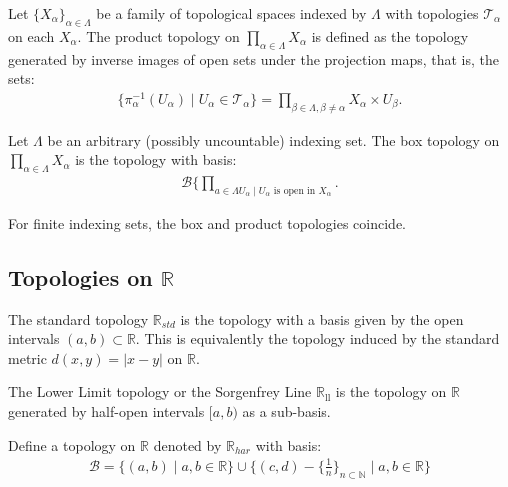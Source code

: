 \documentclass[12pt,letterpaper,reqno]{article}
\begin{document}
\begin{topology}\label{topology:product-topology}
    Let $\{ X_{\alpha} \}_{\alpha \in \Lambda}$ be a family of topological spaces indexed by $\Lambda$ with topologies $\mathcal{T}_{\alpha}$ on each $X_{\alpha}$. The product topology on $\prod_{\alpha \in \Lambda} X_{\alpha}$ is defined as the topology generated by inverse images of open sets under the projection maps, that is, the sets:
    \begin{align*}
        \{ \pi_{\alpha}^{-1}(U_\alpha) \mid U_{\alpha} \in \mathcal{T}_{\alpha} \} = \prod_{\beta \in \Lambda, \beta \neq \alpha } X_{\alpha} \times U_{\beta}.
    \end{align*}
\end{topology}

\begin{topology}\label{topology:box-topology}
    Let $\Lambda$ be an arbitrary (possibly uncountable) indexing set. The box topology on $\prod_{\alpha \in \Lambda} X_{\alpha}$ is the topology with basis:
    \begin{align*}
        \mathcal{B} \{ \prod_{a \in \Lambda U_{\alpha} \mid U_{\alpha} \text{ is open in } X_{\alpha}}.
    \end{align*}
\end{topology}

For finite indexing sets, the box and product topologies coincide.

\subsection{Topologies on $\mathbb{R}$}

\begin{topology}\label{topology:r-std-topology}
    The standard topology $\mathbb{R}_{std}$ is the topology with a basis given by the open intervals $(a, b) \subset \mathbb{R}$. This is equivalently the topology induced by the standard metric $d(x, y) = |x-y|$ on $\mathbb{R}$.
\end{topology}

\begin{topology}\label{topology:r-ll-topology}
    The Lower Limit topology or the Sorgenfrey Line $\mathbb{R}_{\text{ll}}$ is the topology on $\mathbb{R}$ generated by half-open intervals $[a, b)$ as a sub-basis.
\end{topology}

\begin{topology}\label{topology:r-har-topology}
    Define a topology on $\mathbb{R}$ denoted by $\mathbb{R}_{har}$ with basis:
    \begin{align*}
        \mathcal{B} = \{ (a, b) \mid a, b \in \mathbb{R}  \} \cup \{ (c, d) - \{ \frac{1}{n} \}_{n \subset \mathbb{N}} \mid a, b \in \mathbb{R} \}
    \end{align*}
\end{topology}
\end{document}

